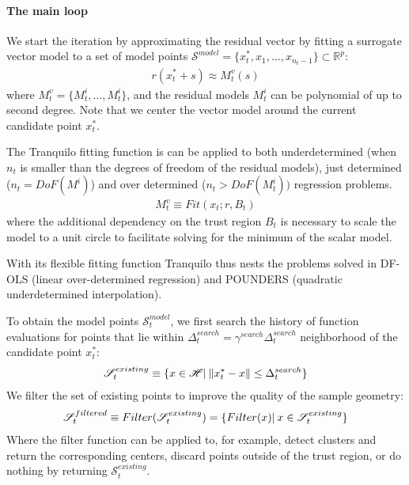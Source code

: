 \paragraph{The main loop} We start the iteration by approximating the residual vector by fitting a surrogate vector model to a set of model points $\mathcal{S}^{model}=\{x_t^*,x_1,\dots,x_{n_{t}-1}\}\subset\mathbb{R}^p$:
\begin{align}
    r(x_t^*+s)\approx M_t^v(s)
    \label{eq:vec-model}
\end{align}
where $M_t^v = \{M_t^i,\dots,M_t^i\}$, and the residual models $M^i_t$ can be polynomial of up to second degree. Note that we center the vector model around the current candidate point $x_t^*$.

The Tranquilo fitting function is can be applied to both underdetermined (when $n_t$ is smaller than the degrees of freedom of the residual models), just determined ($n_t=DoF(M^i)$) and over determined ($n_t>DoF(M^i_t))$ regression problems.
\begin{align}
    M_t^v\equiv Fit(x_t;r,B_t)
    \label{eq:fit-model}
\end{align}
where the additional dependency on the trust region $B_t$ is necessary to scale the model to a unit circle to facilitate solving for the minimum of the scalar model.

With its flexible fitting function Tranquilo thus nests the problems solved in DF-OLS (linear over-determined regression) and POUNDERS (quadratic underdetermined interpolation).

To obtain the model points $\mathcal{S}^{model}_t$, we first search the history of function evaluations for points that lie within $\Delta_t^{search}=\gamma^{search}\Delta_t^{search}$ neighborhood of the candidate point $x_t^*$:
\begin{align}
    \mathscr{S}^{existing}_t\equiv\{x\in\mathscr{H}|\hspace{0.2em}\lVert x^*_t-x\rVert\leq\Delta^{search}_t\}
    \label{eq:hist-search}
\end{align}
We filter the set of existing points to improve the quality of the sample geometry:
\begin{align}
    \mathscr{S}^{filtered}_t\equiv Filter (\mathscr{S}^{existing}_t) = \{ Filter (x)|\hspace{0.2em} x\in \mathscr{S}^{existing}_t\}
    \label{eq:filtering}
\end{align}
Where the filter function can be applied to, for example, detect clusters and return the corresponding centers, discard points outside of the trust region, or do nothing by returning $\mathcal{S}_t^{existing}$.

